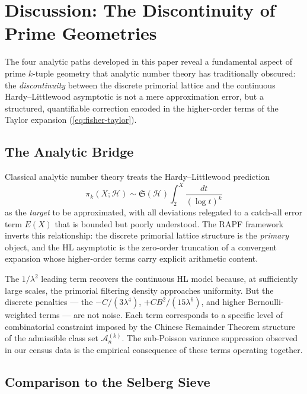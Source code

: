 \documentclass[11pt]{article}
\theoremstyle{remark}
\begin{document}
\section{Discussion: The Discontinuity of Prime Geometries}
\label{sec:discussion}

The four analytic paths developed in this paper reveal a fundamental
aspect of prime $k$-tuple geometry that analytic number theory has
traditionally obscured: the \emph{discontinuity} between the discrete
primorial lattice and the continuous Hardy--Littlewood asymptotic is not
a mere approximation error, but a structured, quantifiable correction
encoded in the higher-order terms of the Taylor expansion
(\ref{eq:fisher-taylor}).

\subsection{The Analytic Bridge}

Classical analytic number theory treats the Hardy--Littlewood prediction
\begin{equation}
\pi_k(X; \mathcal{H}) \sim \mathfrak{S}(\mathcal{H}) \int_2^X
\frac{dt}{(\log t)^k}
\end{equation}
as the \emph{target} to be approximated, with all deviations relegated
to a catch-all error term $E(X)$ that is bounded but poorly understood.
The RAPF framework inverts this relationship: the discrete primorial
lattice structure is the \emph{primary} object, and the HL asymptotic
is the zero-order truncation of a convergent expansion whose higher-order
terms carry explicit arithmetic content.

The $1/\lambda^2$ leading term recovers the continuous HL model because,
at sufficiently large scales, the primorial filtering density approaches
uniformity. But the discrete penalties --- the $-C/(3\lambda^4)$,
$+CB^2/(15\lambda^6)$, and higher Bernoulli-weighted terms --- are not
noise. Each term corresponds to a specific level of combinatorial
constraint imposed by the Chinese Remainder Theorem structure of the
admissible class set $\mathcal{A}_n^{(k)}$. The sub-Poisson variance
suppression observed in our census data is the empirical consequence of
these terms operating together.

\subsection{Comparison to the Selberg Sieve}
\end{document}
